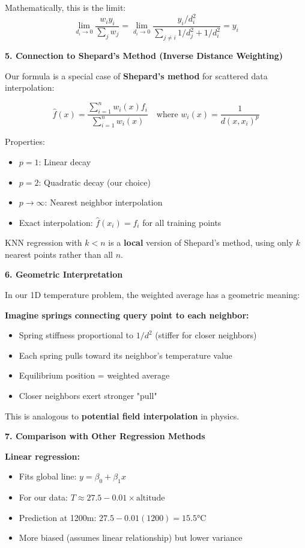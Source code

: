 \documentclass[12pt]{article}
\begin{document}
\begin{explanation}
Mathematically, this is the limit:
\[
\lim_{d_i \to 0} \frac{w_i y_i}{\sum_j w_j} = \lim_{d_i \to 0} \frac{y_i / d_i^2}{\sum_{j \neq i} 1/d_j^2 + 1/d_i^2} = y_i
\]

\textbf{5. Connection to Shepard's Method (Inverse Distance Weighting)}

Our formula is a special case of \textbf{Shepard's method} for scattered data interpolation:

\[
\hat{f}(x) = \frac{\sum_{i=1}^n w_i(x) f_i}{\sum_{i=1}^n w_i(x)} \quad \text{where } w_i(x) = \frac{1}{d(x, x_i)^p}
\]

Properties:
\begin{itemize}
    \item \(p=1\): Linear decay
    \item \(p=2\): Quadratic decay (our choice)
    \item \(p \to \infty\): Nearest neighbor interpolation
    \item Exact interpolation: \(\hat{f}(x_i) = f_i\) for all training points
\end{itemize}

KNN regression with \(k < n\) is a \textbf{local} version of Shepard's method, using only \(k\) nearest points rather than all \(n\).

\textbf{6. Geometric Interpretation}

In our 1D temperature problem, the weighted average has a geometric meaning:

\textbf{Imagine springs connecting query point to each neighbor:}
\begin{itemize}
    \item Spring stiffness proportional to \(1/d^2\) (stiffer for closer neighbors)
    \item Each spring pulls toward its neighbor's temperature value
    \item Equilibrium position = weighted average
    \item Closer neighbors exert stronger "pull"
\end{itemize}

This is analogous to \textbf{potential field interpolation} in physics.

\textbf{7. Comparison with Other Regression Methods}

\textbf{Linear regression:}
\begin{itemize}
    \item Fits global line: \(y = \beta_0 + \beta_1 x\)
    \item For our data: \(T \approx 27.5 - 0.01 \times \text{altitude}\)
    \item Prediction at 1200m: \(27.5 - 0.01(1200) = 15.5°\)C
    \item More biased (assumes linear relationship) but lower variance
\end{itemize}


\end{explanation}
\end{document}
